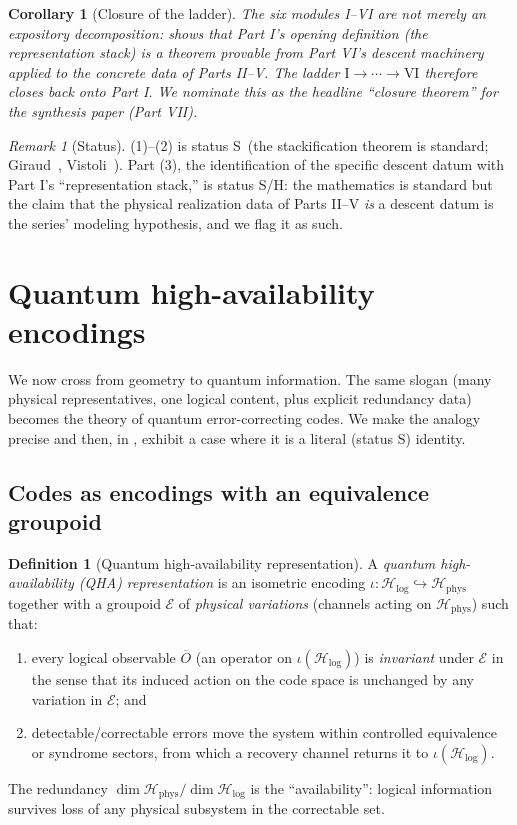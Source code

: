 \documentclass[12pt]{article}
\newtheorem{corollary}[theorem]{Corollary}
\theoremstyle{definition}
\newtheorem{definition}[theorem]{Definition}
\theoremstyle{remark}
\newtheorem{remark}[theorem]{Remark}
\newcommand{\Ho}{\mathcal{H}}
\newcommand{\Hphys}{\Ho_{\mathrm{phys}}}
\newcommand{\Hlog}{\Ho_{\mathrm{log}}}
\newcommand{\Ss}{\textsf{S}}
\newcommand{\Hh}{\textsf{H}}
\begin{document}
\begin{corollary}[Closure of the ladder]
\label{cor:closure}
The six modules I--VI are not merely an expository decomposition: 
shows that Part I's opening definition (the representation stack) is a theorem provable
from Part VI's descent machinery applied to the concrete data of Parts II--V. The ladder
$\text{I}\to\cdots\to\text{VI}$ therefore closes back onto Part I. We nominate this as the
headline ``closure theorem'' for the synthesis paper (Part VII).
\end{corollary}

\begin{remark}[Status]
\label{rem:t2-status}
(1)--(2) is status \Ss\ (the stackification theorem is standard;
Giraud~\cite{Giraud}, Vistoli~\cite{Vistoli}). Part (3), the identification of the
specific descent datum with
Part I's ``representation stack,'' is status \Ss/\Hh: the mathematics is standard but the
claim that the physical realization data of Parts II--V \emph{is} a descent datum is the
series' modeling hypothesis, and we flag it as such.
\end{remark}

\section{Quantum high-availability encodings}
\label{sec:qha}

We now cross from geometry to quantum information. The same slogan (many physical
representatives, one logical content, plus explicit redundancy data) becomes the
theory of quantum error-correcting codes. We make the analogy precise and then, in
, exhibit a case where it is a literal (status \Ss) identity.

\subsection{Codes as encodings with an equivalence groupoid}

\begin{definition}[Quantum high-availability representation]
\label{def:qha}
A \emph{quantum high-availability (QHA) representation} is an isometric encoding
$\iota:\Hlog\hookrightarrow\Hphys$ together with a groupoid $\mathcal E$ of
\emph{physical variations} (channels acting on $\Hphys$) such that:
\begin{enumerate}
\item every logical observable $\overline{O}$ (an operator on $\iota(\Hlog)$) is
\emph{invariant} under $\mathcal E$ in the sense that its induced action on the code
space is unchanged by any variation in $\mathcal E$; and
\item detectable/correctable errors move the system within controlled equivalence or
syndrome sectors, from which a recovery channel returns it to $\iota(\Hlog)$.
\end{enumerate}
The redundancy $\dim\Hphys/\dim\Hlog$ is the ``availability'': logical information
survives loss of any physical subsystem in the correctable set.
\end{definition}
\end{document}
